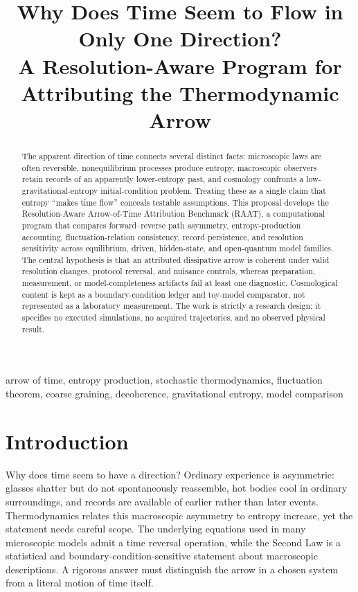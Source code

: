 \documentclass[conference]{../../../../Conference-LaTeX-template_10-17-19/IEEEtran}
\begin{document}
\title{Why Does Time Seem to Flow in Only One Direction?\\
\large A Resolution-Aware Program for Attributing the Thermodynamic Arrow}
\author{}
\maketitle

\begin{abstract}
The apparent direction of time connects several distinct facts: microscopic laws are often reversible, nonequilibrium processes produce entropy, macroscopic observers retain records of an apparently lower-entropy past, and cosmology confronts a low-gravitational-entropy initial-condition problem. Treating these as a single claim that entropy ``makes time flow'' conceals testable assumptions. This proposal develops the Resolution-Aware Arrow-of-Time Attribution Benchmark (RAAT), a computational program that compares forward--reverse path asymmetry, entropy-production accounting, fluctuation-relation consistency, record persistence, and resolution sensitivity across equilibrium, driven, hidden-state, and open-quantum model families. The central hypothesis is that an attributed dissipative arrow is coherent under valid resolution changes, protocol reversal, and nuisance controls, whereas preparation, measurement, or model-completeness artifacts fail at least one diagnostic. Cosmological content is kept as a boundary-condition ledger and toy-model comparator, not represented as a laboratory measurement. The work is strictly a research design: it specifies no executed simulations, no acquired trajectories, and no observed physical result.
\end{abstract}

\begin{IEEEkeywords}
arrow of time, entropy production, stochastic thermodynamics, fluctuation theorem, coarse graining, decoherence, gravitational entropy, model comparison
\end{IEEEkeywords}

\section{Introduction}

Why does time seem to have a direction? Ordinary experience is asymmetric: glasses shatter but do not spontaneously reassemble, hot bodies cool in ordinary surroundings, and records are available of earlier rather than later events. Thermodynamics relates this macroscopic asymmetry to entropy increase, yet the statement needs careful scope. The underlying equations used in many microscopic models admit a time reversal operation, while the Second Law is a statistical and boundary-condition-sensitive statement about macroscopic descriptions. A rigorous answer must distinguish the arrow in a chosen system from a literal motion of time itself.
\end{document}

